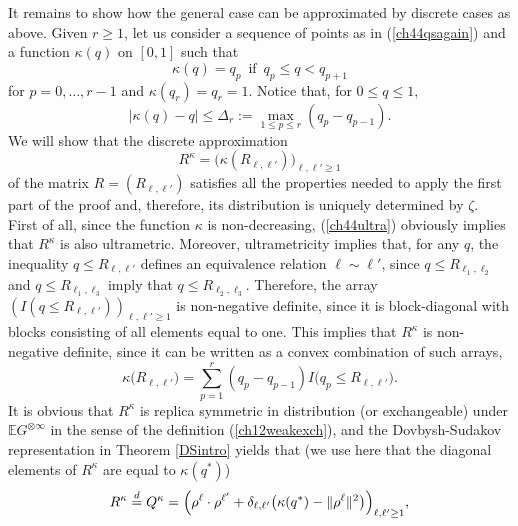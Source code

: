 \documentclass[12pt]{article}
\newcommand{\e}{\mathbb{E}}
\theoremstyle{nonumberplain}
\begin{document}
It remains to show how the general case can be approximated by discrete cases as above. Given $r\geq 1$, let us consider a sequence of points as in (\ref{ch44qsagain}) and a function $\kappa(q)$ on $[0,1]$ such that 
\begin{equation}
\kappa(q) = q_p  \,\mbox{ if }\, q_p \leq q< q_{p+1}
\label{ch44finite}
\end{equation}
for $p=0,\ldots, r-1$ and $\kappa(q_r)=q_r=1$. Notice that, for $0\leq q\leq 1,$
\begin{equation}
| \kappa(q) - q | \leq \Delta_r := \max_{1\leq p\leq r} (q_p-q_{p-1}). 
\label{ch44Deltar}
\end{equation}
We will show that the discrete approximation 
\begin{equation}
R^\kappa = \bigl(\kappa(R_{\ell,\ell'}) \bigr)_{\ell,\ell'\geq 1}
\label{ch44Rkappa}
\end{equation} 
of the matrix $R= (R_{\ell,\ell'})$ satisfies all the properties needed to apply the first part of the proof and, therefore, its distribution is uniquely determined by $\zeta.$ First of all, since the function $\kappa$ is non-decreasing, (\ref{ch44ultra}) obviously implies that $R^\kappa$ is also ultrametric. Moreover, ultrametricity implies that, for any $q$, the inequality $q\leq R_{\ell,\ell'}$ defines an equivalence relation $\ell\sim \ell'$, since $q\leq R_{\ell_1,\ell_2}$ and $q\leq R_{\ell_1,\ell_3}$ imply that $q\leq R_{\ell_2,\ell_3}$. Therefore, the array $(I(q\leq R_{\ell,\ell'}))_{\ell,\ell'\geq 1}$ is non-negative definite, since it is block-diagonal with blocks consisting of all elements equal to one. This implies that $R^\kappa$ is non-negative definite, since it can be written as a convex combination of such arrays,
\begin{equation}
\kappa\bigl(R_{\ell,\ell'}\bigr) = \sum_{p=1}^{r} (q_p-q_{p-1}) I\bigl(q_p \leq R_{\ell,\ell'}\bigr).
\label{ch44kappa1}
\end{equation}
It is obvious that $R^\kappa$ is replica symmetric in distribution (or exchangeable) under $\e G^{\otimes \infty}$ in the sense of the definition (\ref{ch12weakexch}), and the Dovbysh-Sudakov representation in Theorem \ref{DSintro} yields that (we use here that the diagonal elements of $R^\kappa$ are equal to $\kappa(q^*)$)
\begin{equation}
R^\kappa \stackrel{d}{=}
Q^\kappa =
\Bigl(
\rho^{\ell} \cdot \rho^{\ell'} + \delta_{\ell,\ell'} \bigl(\kappa(q^*) - \|\rho^{\ell}\|^2 \bigr)
\Bigr)_{\ell,\ell'\geq 1},
\label{ch44RkappaG}
\end{equation}
\end{document}
